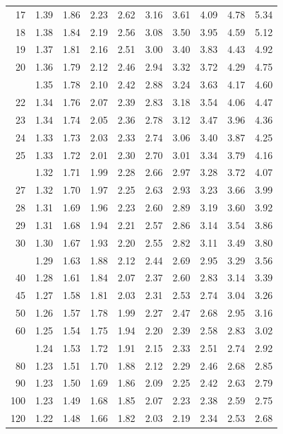 \documentclass[10pt]{article}
\begin{document}
\begin{longtable}{@{}r!{\vrule width 0.8pt\hspace{0.55em}}rrrrrrrrr@{}}
17 & 1.39 & 1.86 & 2.23 & 2.62 & 3.16 & 3.61 & 4.09 & 4.78 & 5.34 \\
18 & 1.38 & 1.84 & 2.19 & 2.56 & 3.08 & 3.50 & 3.95 & 4.59 & 5.12 \\
19 & 1.37 & 1.81 & 2.16 & 2.51 & 3.00 & 3.40 & 3.83 & 4.43 & 4.92 \\
20 & 1.36 & 1.79 & 2.12 & 2.46 & 2.94 & 3.32 & 3.72 & 4.29 & 4.75 \\
 & 1.35 & 1.78 & 2.10 & 2.42 & 2.88 & 3.24 & 3.63 & 4.17 & 4.60 \\
22 & 1.34 & 1.76 & 2.07 & 2.39 & 2.83 & 3.18 & 3.54 & 4.06 & 4.47 \\
23 & 1.34 & 1.74 & 2.05 & 2.36 & 2.78 & 3.12 & 3.47 & 3.96 & 4.36 \\
24 & 1.33 & 1.73 & 2.03 & 2.33 & 2.74 & 3.06 & 3.40 & 3.87 & 4.25 \\
25 & 1.33 & 1.72 & 2.01 & 2.30 & 2.70 & 3.01 & 3.34 & 3.79 & 4.16 \\
 & 1.32 & 1.71 & 1.99 & 2.28 & 2.66 & 2.97 & 3.28 & 3.72 & 4.07 \\
27 & 1.32 & 1.70 & 1.97 & 2.25 & 2.63 & 2.93 & 3.23 & 3.66 & 3.99 \\
28 & 1.31 & 1.69 & 1.96 & 2.23 & 2.60 & 2.89 & 3.19 & 3.60 & 3.92 \\
29 & 1.31 & 1.68 & 1.94 & 2.21 & 2.57 & 2.86 & 3.14 & 3.54 & 3.86 \\
30 & 1.30 & 1.67 & 1.93 & 2.20 & 2.55 & 2.82 & 3.11 & 3.49 & 3.80 \\
 & 1.29 & 1.63 & 1.88 & 2.12 & 2.44 & 2.69 & 2.95 & 3.29 & 3.56 \\
40 & 1.28 & 1.61 & 1.84 & 2.07 & 2.37 & 2.60 & 2.83 & 3.14 & 3.39 \\
45 & 1.27 & 1.58 & 1.81 & 2.03 & 2.31 & 2.53 & 2.74 & 3.04 & 3.26 \\
50 & 1.26 & 1.57 & 1.78 & 1.99 & 2.27 & 2.47 & 2.68 & 2.95 & 3.16 \\
60 & 1.25 & 1.54 & 1.75 & 1.94 & 2.20 & 2.39 & 2.58 & 2.83 & 3.02 \\
 & 1.24 & 1.53 & 1.72 & 1.91 & 2.15 & 2.33 & 2.51 & 2.74 & 2.92 \\
80 & 1.23 & 1.51 & 1.70 & 1.88 & 2.12 & 2.29 & 2.46 & 2.68 & 2.85 \\
90 & 1.23 & 1.50 & 1.69 & 1.86 & 2.09 & 2.25 & 2.42 & 2.63 & 2.79 \\
100 & 1.23 & 1.49 & 1.68 & 1.85 & 2.07 & 2.23 & 2.38 & 2.59 & 2.75 \\
120 & 1.22 & 1.48 & 1.66 & 1.82 & 2.03 & 2.19 & 2.34 & 2.53 & 2.68 \\

\end{longtable}
\end{document}
